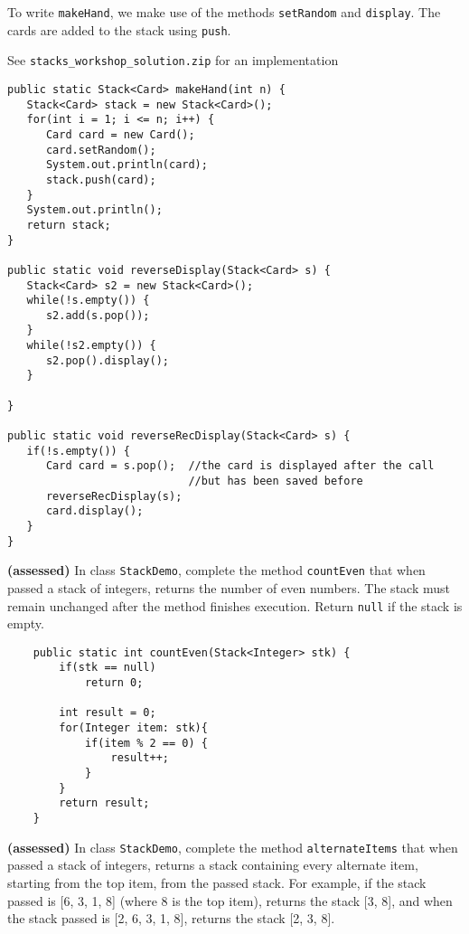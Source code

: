 \begin{questions}
\begin{solution}
To write {\tt makeHand}, we make use of the methods {\tt setRandom} and {\tt display}. The cards are added to
the stack using {\tt push}.

See \texttt{stacks\_workshop\_solution.zip} for an implementation
\begin{lstlisting}
public static Stack<Card> makeHand(int n) {
   Stack<Card> stack = new Stack<Card>();
   for(int i = 1; i <= n; i++) {
      Card card = new Card();
      card.setRandom();
      System.out.println(card);
      stack.push(card);
   }
   System.out.println();
   return stack;
}

public static void reverseDisplay(Stack<Card> s) {
   Stack<Card> s2 = new Stack<Card>();
   while(!s.empty()) {
      s2.add(s.pop());      
   }
   while(!s2.empty()) {
      s2.pop().display();        
   }
   
}
   
public static void reverseRecDisplay(Stack<Card> s) {
   if(!s.empty()) {
      Card card = s.pop();  //the card is displayed after the call 
                            //but has been saved before    
      reverseRecDisplay(s);
      card.display();
   }           
}
\end{lstlisting}
\end{solution}


\question  \textbf{(assessed)} In class \texttt{StackDemo}, complete the method \texttt{countEven} that when passed a stack of integers, returns the number of even numbers. The stack must remain unchanged after the method finishes execution. Return \texttt{null} if the stack is empty.
\begin{solution}
\begin{lstlisting}
	public static int countEven(Stack<Integer> stk) {
		if(stk == null)
			return 0;
		
		int result = 0;
		for(Integer item: stk){
			if(item % 2 == 0) {
				result++;
			}
		}
		return result;
	}
\end{lstlisting}
\end{solution}

\question  \textbf{(assessed)} In class \texttt{StackDemo}, complete the method \texttt{alternateItems} that when passed a stack of integers, returns a stack containing every alternate item, starting from the top item, from the passed stack. For example, if the stack passed is [6, 3, 1, 8] (where 8 is the top item), returns the stack [3, 8], and when the stack passed is [2, 6, 3, 1, 8], returns the stack [2, 3, 8].

 \begin{solution}
 

\end{solution}
\end{questions}
